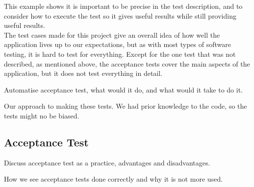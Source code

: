 This example shows it is important to be precise in the test description, and to consider how to execute the test so it gives useful results while still providing useful results.\\

The test cases made for this project give an overall idea of how well the application lives up to our expectations, but as with most types of software testing, it is hard to test for everything.
Except for the one test that was not described, as mentioned above, the acceptance tests cover the main aspects of the application, but it does not test everything in detail.


%
%
%


Automatise acceptance test, what would it do, and what would it take to do it.

Our approach to making these tests. We had prior knowledge to the code, so the tests might no be biased.



\subsection{Acceptance Test}
Discuss acceptance test as a practice, advantages and disadvantages.

How we see acceptance tests done correctly and why it is not more used.
